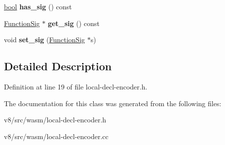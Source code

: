 \begin{DoxyCompactItemize}
\item 
\mbox{\label{classv8_1_1internal_1_1wasm_1_1LocalDeclEncoder_ab1c3009d60de2e3e149ad1d1bc657d0e}} 
\mbox{\hyperlink{classbool}{bool}} {\bfseries has\+\_\+sig} () const
\item 
\mbox{\label{classv8_1_1internal_1_1wasm_1_1LocalDeclEncoder_a01426a35e394251872ef8829c8d1699a}} 
\mbox{\hyperlink{classv8_1_1internal_1_1Signature}{Function\+Sig}} $\ast$ {\bfseries get\+\_\+sig} () const
\item 
\mbox{\label{classv8_1_1internal_1_1wasm_1_1LocalDeclEncoder_aaf89d214d58c4d5eb7ef3ccf60a04350}} 
void {\bfseries set\+\_\+sig} (\mbox{\hyperlink{classv8_1_1internal_1_1Signature}{Function\+Sig}} $\ast$s)
\end{DoxyCompactItemize}


\subsection{Detailed Description}


Definition at line 19 of file local-\/decl-\/encoder.\+h.



The documentation for this class was generated from the following files\+:\begin{DoxyCompactItemize}
\item 
v8/src/wasm/local-\/decl-\/encoder.\+h\item 
v8/src/wasm/local-\/decl-\/encoder.\+cc\end{DoxyCompactItemize}
